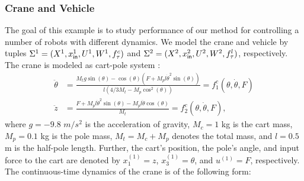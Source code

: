 \subsubsection{Crane and Vehicle}
\label{subsec}
The goal of this example is to study performance of our method for controlling a number of robots with different dynamics. %
We model the crane and vehicle by tuples $\Sigma^1=(X^1,x_{\mathsf{in}}^1,U^1,W^1,f_\tau^c)$ and $\Sigma^2=(X^2,x_{\mathsf{in}}^2,U^2,W^2,f_\tau^l)$, respectively. 
The crane is modeled as cart-pole system \cite{Barto1983}:
\begin{align*}
	\ddot{\theta} &= \frac{M_tg\sin(\theta) - \cos(\theta)(F + M_pl \dot{\theta}^2 \sin(\theta))}{l(4/3 M_t- M_p \cos^2(\theta))}=f^c_1(\theta,\dot{\theta},F)\\
	\ddot{z}&= \frac{F + M_pl \dot{\theta}^2 \sin(\theta)-M_pl \ddot{\theta} \cos(\theta)}{M_t}=f^c_2(\theta,\dot{\theta},F),
\end{align*}
where
	$g=-9.8$ $m/s^2$ is the acceleration of gravity,
	$M_c=1$ kg is the cart mass,
	$M_p=0.1$ kg is the pole mass,
	$M_t=M_c+M_p$ denotes the total mass,
and
	$l=0.5$ m is the half-pole length.
Further, the cart's position, the pole's angle, and input force to the cart are denoted by $x_1^{(1)}=z$, $x_3^{(1)}=\theta$, 
and $u^{(1)}=F$, respectively. 
The continuous-time dynamics of the crane is of the following form:
